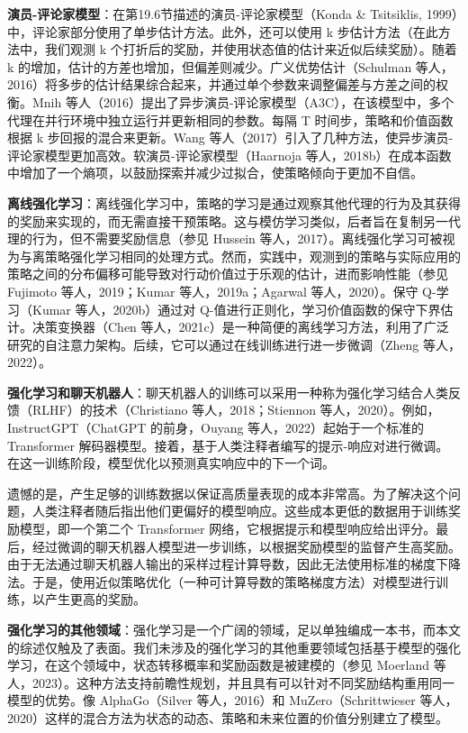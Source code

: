 \textbf{演员-评论家模型}：在第19.6节描述的演员-评论家模型（Konda & Tsitsiklis, 1999）中，评论家部分使用了单步估计方法。此外，还可以使用 k 步估计方法（在此方法中，我们观测 k 个打折后的奖励，并使用状态值的估计来近似后续奖励）。随着 k 的增加，估计的方差也增加，但偏差则减少。广义优势估计（Schulman 等人，2016）将多步的估计结果综合起来，并通过单个参数来调整偏差与方差之间的权衡。Mnih 等人（2016）提出了异步演员-评论家模型（A3C），在该模型中，多个代理在并行环境中独立运行并更新相同的参数。每隔 T 时间步，策略和价值函数根据 k 步回报的混合来更新。Wang 等人（2017）引入了几种方法，使异步演员-评论家模型更加高效。软演员-评论家模型（Haarnoja 等人，2018b）在成本函数中增加了一个熵项，以鼓励探索并减少过拟合，使策略倾向于更加不自信。

\textbf{离线强化学习}：离线强化学习中，策略的学习是通过观察其他代理的行为及其获得的奖励来实现的，而无需直接干预策略。这与模仿学习类似，后者旨在复制另一代理的行为，但不需要奖励信息（参见 Hussein 等人，2017）。离线强化学习可被视为与离策略强化学习相同的处理方式。然而，实践中，观测到的策略与实际应用的策略之间的分布偏移可能导致对行动价值过于乐观的估计，进而影响性能（参见 Fujimoto 等人，2019；Kumar 等人，2019a；Agarwal 等人，2020）。保守 Q-学习（Kumar 等人，2020b）通过对 Q-值进行正则化，学习价值函数的保守下界估计。决策变换器（Chen 等人，2021c）是一种简便的离线学习方法，利用了广泛研究的自注意力架构。后续，它可以通过在线训练进行进一步微调（Zheng 等人，2022）。

\textbf{强化学习和聊天机器人}：聊天机器人的训练可以采用一种称为强化学习结合人类反馈（RLHF）的技术（Christiano 等人，2018；Stiennon 等人，2020）。例如，InstructGPT（ChatGPT 的前身，Ouyang 等人，2022）起始于一个标准的 Transformer 解码器模型。接着，基于人类注释者编写的提示-响应对进行微调。在这一训练阶段，模型优化以预测真实响应中的下一个词。

遗憾的是，产生足够的训练数据以保证高质量表现的成本非常高。为了解决这个问题，人类注释者随后指出他们更偏好的模型响应。这些成本更低的数据用于训练奖励模型，即一个第二个 Transformer 网络，它根据提示和模型响应给出评分。最后，经过微调的聊天机器人模型进一步训练，以根据奖励模型的监督产生高奖励。由于无法通过聊天机器人输出的采样过程计算导数，因此无法使用标准的梯度下降法。于是，使用近似策略优化（一种可计算导数的策略梯度方法）对模型进行训练，以产生更高的奖励。

\textbf{强化学习的其他领域}：强化学习是一个广阔的领域，足以单独编成一本书，而本文的综述仅触及了表面。我们未涉及的强化学习的其他重要领域包括基于模型的强化学习，在这个领域中，状态转移概率和奖励函数是被建模的（参见 Moerland 等人，2023）。这种方法支持前瞻性规划，并且具有可以针对不同奖励结构重用同一模型的优势。像 AlphaGo（Silver 等人，2016）和 MuZero（Schrittwieser 等人，2020）这样的混合方法为状态的动态、策略和未来位置的价值分别建立了模型。

